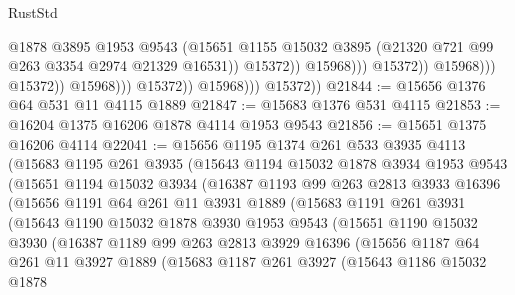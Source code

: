 \begin{lexlean}{RustStd}
\begin{coremodule}
                                                @1878
                                                @3895
                                                @1953
                                                @9543
                                                (@15651
                                                  @1155
                                                  @15032
                                                  @3895
                                                  (@21320 @721 @99 @263 @3354 @2974 @21329 @16531))
                                                @15372))
                                            @15968)))
                                      @15372))
                                  @15968)))
                            @15372))
                        @15968)))
                  @15372))
              @15968)))
        @15372))
@21844 := @15656 @1376 @64 @531 @11 @4115 @1889
@21847 := @15683 @1376 @531 @4115
@21853 := @16204 @1375 @16206 @1878 @4114 @1953 @9543
@21856 := @15651 @1375 @16206 @4114
@22041 := @15656
    @1195
    @1374
    @261
    @533
    @3935
    @4113
    (@15683
      @1195
      @261
      @3935
      (@15643
        @1194
        @15032
        @1878
        @3934
        @1953
        @9543
        (@15651
          @1194
          @15032
          @3934
          (@16387
            @1193
            @99
            @263
            @2813
            @3933
            @16396
            (@15656
              @1191
              @64
              @261
              @11
              @3931
              @1889
              (@15683
                @1191
                @261
                @3931
                (@15643
                  @1190
                  @15032
                  @1878
                  @3930
                  @1953
                  @9543
                  (@15651
                    @1190
                    @15032
                    @3930
                    (@16387
                      @1189
                      @99
                      @263
                      @2813
                      @3929
                      @16396
                      (@15656
                        @1187
                        @64
                        @261
                        @11
                        @3927
                        @1889
                        (@15683
                          @1187
                          @261
                          @3927
                          (@15643
                            @1186
                            @15032
                            @1878

\end{coremodule}
\end{lexlean}
